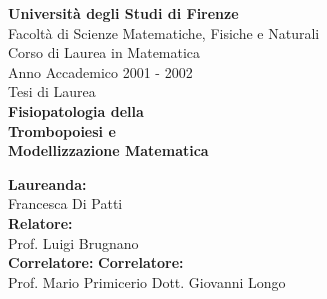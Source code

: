 \thispagestyle{empty}
\begin{figure}
\begin{center}
\end{center}
\end{figure}
\begin{center}
{\LARGE\bf{Universit\`a degli Studi di Firenze}}\\
\vskip 0.5cm
{\Large Facolt\`a di Scienze Matematiche, Fisiche e Naturali}\\
\medskip
{\Large Corso di Laurea in Matematica }\\
\vskip 0.3cm
{\large Anno Accademico 2001 - 2002}\\
\vskip 0.3cm
{\large Tesi di Laurea}\\
\vspace{1.1cm}
{\Huge\bf{Fisiopatologia della}}\\
\vskip 4.2mm
{\Huge\bf{Trombopoiesi e}}\\
\vskip 4.2mm
{\Huge\bf{Modellizzazione Matematica}}\\
\vspace{0.7 cm}
\end{center}
\begin{center}
{\large\bf{Laureanda:}}\\
\vspace{ 2mm}
{\Large{Francesca Di Patti}}\\
\vspace{1.7 cm}
{\large\bf{Relatore:}}\\
\vspace{2mm}
{\Large Prof. Luigi Brugnano}\\
\vspace{1.7 cm}
{\large\bf{Correlatore:}} \hspace{4.7cm} {\large\bf{Correlatore:}}\\
\vspace{2mm}
{\Large{Prof. Mario Primicerio}}
  {\Large{Dott. Giovanni Longo}}\\
\end{center}

